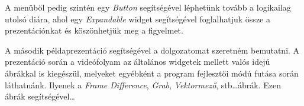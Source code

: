 A menüből pedig szintén egy \textit{Button} segítségével léphetünk tovább a logikailag utolsó diára, ahol egy \textit{Expandable} widget segítségével foglalhatjuk össze a prezentációnkat és köszönhetjük meg a figyelmet.


A második példaprezentáció segítségével a dolgozatomat szeretném bemutatni.
A prezentáció során a videófolyam az általános widgetek mellett valós idejú ábrákkal is kiegészül, melyeket egyébként a program fejlesztői módú futása során láthatnánk. Ilyenek a \textit{Frame Difference}, \textit{Grab}, \textit{Vektormező}, stb\ldots ábrák. Ezen ábrák segítségével\ldots

